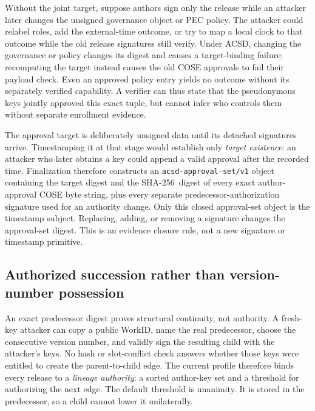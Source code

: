 \documentclass[acmsmall,screen,review,nonacm]{acmart}
\newcommand{\sha}{\textsf{SHA-256}}
\begin{document}
Without the joint target, suppose authors sign only the release while an
attacker later changes the unsigned governance object or PEC policy. The
attacker could relabel roles, add the external-time outcome, or try to map a
local clock to that outcome while the old release signatures still verify.
Under ACSD, changing the governance or policy changes its digest and causes a
target-binding failure; recomputing the target instead causes the old COSE
approvals to fail their payload check. Even an approved policy entry yields no
outcome without its separately verified capability. A verifier can thus state
that the pseudonymous keys jointly approved this exact tuple, but cannot infer
who controls them without separate enrollment evidence.

The approval target is deliberately unsigned data until its detached
signatures arrive. Timestamping it at that stage would establish only
\emph{target existence}: an attacker who later obtains a key could append a
valid approval after the recorded time. Finalization therefore constructs an
\texttt{acsd-approval-set/v1} object containing the target digest and the
\sha\ digest of every exact author-approval COSE byte string, plus every
separate predecessor-authorization signature used for an authority change.
Only this closed approval-set object is the timestamp subject. Replacing, adding, or
removing a signature changes the approval-set digest. This is an evidence
closure rule, not a new signature or timestamp primitive.

\subsection{Authorized succession rather than version-number possession}

An exact predecessor digest proves structural continuity, not authority. A
fresh-key attacker can copy a public WorkID, name the real predecessor, choose
the consecutive version number, and validly sign the resulting child with the
attacker's keys. No hash or slot-conflict check answers whether those keys were
entitled to create the parent-to-child edge. The current profile therefore binds every
release to a \emph{lineage authority}: a sorted author-key set and a threshold
for authorizing the next edge. The default threshold is unanimity. It is stored
in the predecessor, so a child cannot lower it unilaterally.
\end{document}

